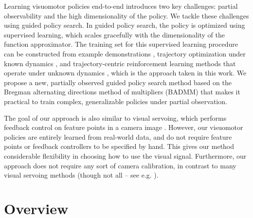 \documentclass[conference]{IEEEtran}
\begin{document}
Learning visuomotor policies end-to-end introduces two key challenges: partial observability and the high dimensionality of the policy. We tackle these challenges using guided policy search. In guided policy search, the policy is optimized using supervised learning, which scales gracefully with the dimensionality of the function approximator. The training set for this supervised learning procedure can be constructed from example demonstrations \cite{lk-gps-13}, trajectory optimization under known dynamics \cite{lk-vpsto-13,lk-lcnnp-14,mt-cbfat-14}, and trajectory-centric reinforcement learning methods that operate under unknown dynamics \cite{la-lnnpg-14,lwa-lnnpg-15}, which is the approach taken in this work. We propose a new, partially observed guided policy search method based on the Bregman alternating directions method of multipliers (BADMM) that makes it practical to train complex, generalizable policies under partial observation.

The goal of our approach is also similar to visual servoing, which performs feedback control on feature points in a camera image \cite{ecr-navsr-92,mkd-vbcqp-14,whb-reecu-96}. However, our visuomotor policies are entirely learned from real-world data, and do not require feature points or feedback controllers to be specified by hand. This gives our method considerable flexibility in choosing how to use the visual signal. Furthermore, our approach does not require any sort of camera calibration, in contrast to many visual servoing methods (though not all -- see e.g. \cite{jfn-eeuvs-97,ya-auvs-94}).



\section{Overview}
\label{sec:overview}
\end{document}
